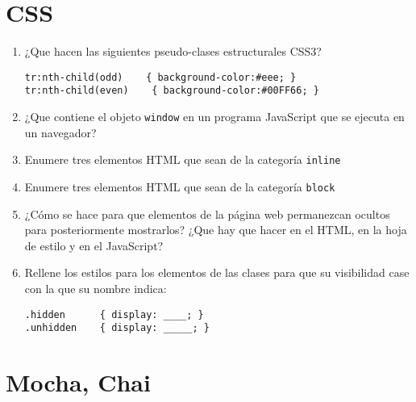 \documentclass[spanish,a4paper,11pt]{article}
\begin{document}
\section{CSS}
\begin{enumerate}
\item  ¿Que hacen las siguientes pseudo-clases estructurales CSS3?
\begin{verbatim}
tr:nth-child(odd)    { background-color:#eee; }
tr:nth-child(even)    { background-color:#00FF66; }
\end{verbatim}

\item ¿Que contiene el objeto \verb|window| en un programa JavaScript que se ejecuta en un navegador?
\item 
Enumere tres elementos HTML que sean de la categoría \verb|inline|
\item 
Enumere tres elementos HTML que sean de la categoría \verb|block|
\item  ¿Cómo se hace para que elementos de la página web permanezcan ocultos para 
posteriormente mostrarlos? ¿Que hay que hacer en el HTML, en la hoja de estilo y en el JavaScript?
\item Rellene los estilos para los elementos de las clases para que su visibilidad
case con la que su nombre indica:
\begin{verbatim}
.hidden      { display: ____; }
.unhidden    { display: _____; }
\end{verbatim}

\end{enumerate}

\section{Mocha, Chai}
\end{document}
